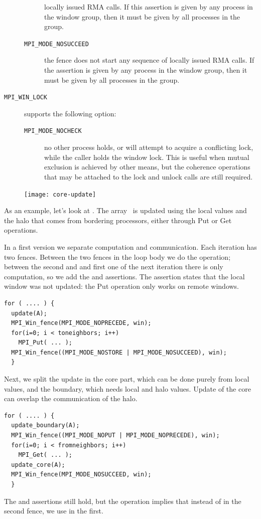 \begin{description}
\begin{description}
    locally issued RMA calls. If this assertion is given by any
    process in the window group, then it must be given by all
    processes in the group.
  \item[\texttt{MPI\_MODE\_NOSUCCEED}] the fence does not start any
    sequence of locally issued RMA calls. If the assertion is given by
    any process in the window group, then it must be given by all
    processes in the group.
  \end{description}
\item[\texttt{MPI\_WIN\_LOCK}] supports the following option:
  \begin{description}
    \item[\texttt{MPI\_MODE\_NOCHECK}] no other process holds, or will attempt to
    acquire a conflicting lock, while the caller holds the window
    lock. This is useful when mutual exclusion is achieved by other
    means, but the coherence operations that may be attached to the
    lock and unlock calls are still required.
  \end{description}
\end{description}

\begin{figure}
  \texttt{[image: core-update]}
\end{figure}
%
As an example, let's look at .
The array~ is updated using the local values and the halo
that comes from bordering processors, either through Put or Get operations.

In a first version we separate computation and communication.
Each iteration has two fences. Between the two fences in the loop body
we do the  operation; between the second and and first one
of the next iteration there is only computation, so we add the
 and  assertions. The  assertion
states that the local window was not updated: the Put operation only
works on remote windows.
\begin{verbatim}
for ( .... ) {
  update(A); 
  MPI_Win_fence(MPI_MODE_NOPRECEDE, win); 
  for(i=0; i < toneighbors; i++) 
    MPI_Put( ... );
  MPI_Win_fence((MPI_MODE_NOSTORE | MPI_MODE_NOSUCCEED), win); 
  }
\end{verbatim}

Next, we split the update in the core part, which can be done purely
from local values, and the boundary, which needs local and halo
values. Update of the core can overlap the communication of the halo.
\begin{verbatim}
for ( .... ) {
  update_boundary(A); 
  MPI_Win_fence((MPI_MODE_NOPUT | MPI_MODE_NOPRECEDE), win); 
  for(i=0; i < fromneighbors; i++) 
    MPI_Get( ... );
  update_core(A); 
  MPI_Win_fence(MPI_MODE_NOSUCCEED, win); 
  }
\end{verbatim}
The  and  assertions still hold, but the
 operation implies that instead of  in the
second fence, we use  in the first.

